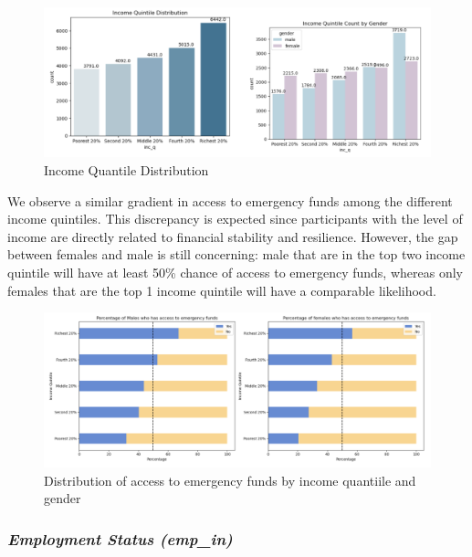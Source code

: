\documentclass[12pt]{article}
\begin{document}
\begin{figure}

{\centering \includegraphics[width=1\linewidth]{graphs/income_graph6} 

}

\caption{Income Quantile Distribution}\label{fig:unnamed-chunk-9}
\end{figure}

We observe a similar gradient in access to emergency funds among the
different income quintiles. This discrepancy is expected since
participants with the level of income are directly related to financial
stability and resilience. However, the gap between females and male is
still concerning: male that are in the top two income quintile will have
at least 50\% chance of access to emergency funds, whereas only females
that are the top 1 income quintile will have a comparable likelihood.

\begin{figure}

{\centering \includegraphics[width=1\linewidth]{graphs/employ_graph7} 

}

\caption{Distribution of access to emergency funds by income quantiile and gender}\label{fig:unnamed-chunk-10}
\end{figure}

\hypertarget{employment-status-emp_in}{%
\subsubsection{\texorpdfstring{\emph{Employment Status
(emp\_in)}}{Employment Status (emp\_in)}}\label{employment-status-emp_in}}
\end{document}
